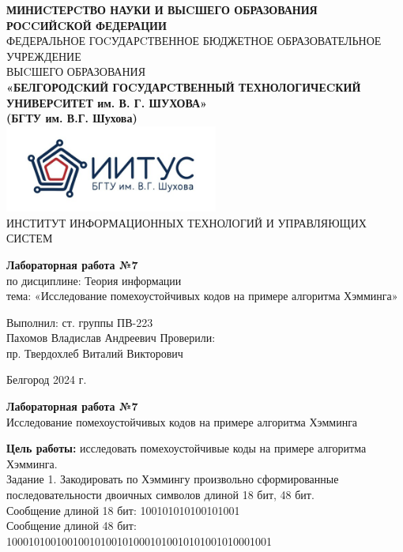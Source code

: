 \documentclass[a4paper,14pt]{extarticle}
\newcommand\textbox[1]{
	\parbox{.45\textwidth}{#1}
}
\begin{document}
\begin{center}
    \small{
        \textbf{МИНИCТЕРCТВО НАУКИ И ВЫCШЕГО ОБРАЗОВАНИЯ РОCCИЙCКОЙ ФЕДЕРАЦИИ}\\
        ФЕДЕРАЛЬНОЕ ГОCУДАРCТВЕННОЕ БЮДЖЕТНОЕ ОБРАЗОВАТЕЛЬНОЕ УЧРЕЖДЕНИЕ\\ВЫCШЕГО ОБРАЗОВАНИЯ \\
        \textbf{«БЕЛГОРОДCКИЙ ГОCУДАРCТВЕННЫЙ ТЕХНОЛОГИЧЕCКИЙ\\УНИВЕРCИТЕТ им. В. Г. ШУХОВА»\\ (БГТУ им. В.Г. Шухова)} \\
        \bigbreak
        \includegraphics[width=70mm]{log}\\
        ИНСТИТУТ ИНФОРМАЦИОННЫХ ТЕХНОЛОГИЙ И УПРАВЛЯЮЩИХ СИСТЕМ\\}
\end{center}

\vfill
\begin{center}
    \large{
        \textbf{
            Лабораторная работа №7}}\\
    \normalsize{
        по дисциплине: Теория информации \\
        тема: «Исследование помехоустойчивых кодов на примере алгоритма Хэмминга»}
\end{center}
\vfill
\hfill\textbox{
    Выполнил: ст. группы ПВ-223\\Пахомов Владислав Андреевич
    \bigbreak
    Проверили: \\пр. Твердохлеб Виталий Викторович
}
\vfill\begin{center}
    Белгород 2024 г.
\end{center}
\newpage
\begin{center}
    \textbf{Лабораторная работа №7}\\
    Исследование помехоустойчивых кодов на примере алгоритма Хэмминга\\
\end{center}
\textbf{Цель работы: }исследовать помехоустойчивые коды на примере алгоритма Хэмминга.\\
Задание 1. Закодировать по Хэммингу произвольно сформированные
последовательности двоичных символов длиной 18 бит, 48 бит.\\
Сообщение длиной 18 бит: 100101010100101001\\
Сообщение длиной 48 бит: 100010100100100101001010001010010101001010001001\\
\end{document}
